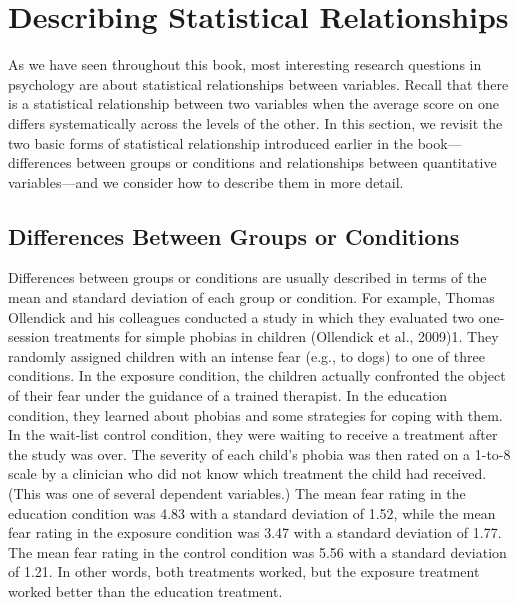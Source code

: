 \section{Describing Statistical Relationships}


As we have seen throughout this book, most interesting research questions in psychology are about statistical relationships between variables. Recall that there is a statistical relationship between two variables when the average score on one differs systematically across the levels of the other. In this section, we revisit the two basic forms of statistical relationship introduced earlier in the book---differences between groups or conditions and relationships between quantitative variables---and we consider how to describe them in more detail.



\subsection{Differences Between Groups or Conditions}

Differences between groups or conditions are usually described in terms of the mean and standard deviation of each group or condition. For example, Thomas Ollendick and his colleagues conducted a study in which they evaluated two one-session treatments for simple phobias in children (Ollendick et al., 2009)1. They randomly assigned children with an intense fear (e.g., to dogs) to one of three conditions. In the exposure condition, the children actually confronted the object of their fear under the guidance of a trained therapist. In the education condition, they learned about phobias and some strategies for coping with them. In the wait-list control condition, they were waiting to receive a treatment after the study was over. The severity of each child's phobia was then rated on a 1-to-8 scale by a clinician who did not know which treatment the child had received. (This was one of several dependent variables.) The mean fear rating in the education condition was 4.83 with a standard deviation of 1.52, while the mean fear rating in the exposure condition was 3.47 with a standard deviation of 1.77. The mean fear rating in the control condition was 5.56 with a standard deviation of 1.21. In other words, both treatments worked, but the exposure treatment worked better than the education treatment. 

